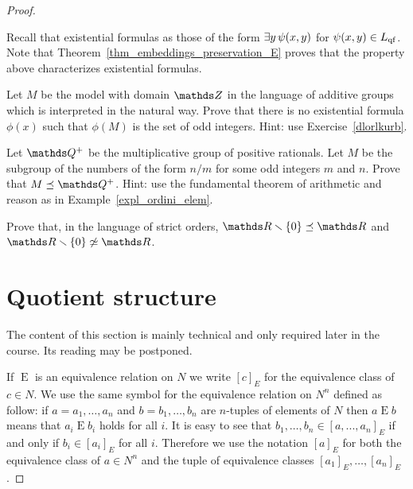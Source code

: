 \begin{proof}
\begin{exercise}
Recall that existential formulas as those of the form $\exists y\,\psi(x,y)$ for $\psi(x,y)\in L_{\rm qf}$.
Note that Theorem~\ref{thm_embeddings_preservation_E} proves that the property above characterizes existential formulas.

\end{exercise}

\begin{exercise}\label{ex_Z_odd_existential}
Let $M$ be the model with domain $\ZZ$ in the language of additive groups which is interpreted in the natural way.
Prove that there is no existential formula $\phi(x)$ such that $\phi(M)$ is the set of odd integers.
Hint: use Exercise~\ref{dlorlkurb}.
\end{exercise}


\begin{exercise}\label{ex_Q_odd}
Let $\QQ^+$ be the multiplicative group of positive rationals.
Let $M$ be the subgroup of the numbers of the form $n/m$ for some odd integers $m$ and $n$.
Prove that $M\preceq\QQ^+$.
Hint: use the fundamental theorem of arithmetic and reason as in Example~\ref{expl_ordini_elem}.
\end{exercise}

\begin{exercise} 
  Prove that, in the language of strict orders, $\RR\sm\{0\}\preceq \RR$ and $\RR\sm\{0\}\not\simeq \RR$.
\end{exercise}
  
\section{Quotient structure}\label{quotient}
\def\ceq#1#2#3{\parbox[b]{20ex}{$\displaystyle #1$}\parbox[b]{6ex}{\hfil$#2$}$\displaystyle #3$}

The content of this section is mainly technical and only required later in the course.
Its reading may be postponed.


If $\mathrel{E}$ is an equivalence relation on $N$ we write \emph{$[c]_E$\/} for the equivalence class of $c\in N$.
We use the same symbol for the equivalence relation on $N^n$ defined as follow: if $a=a_1,\dots,a_n$ and $b=b_1,\dots,b_n$ are $n$-tuples of elements of $N$ then \emph{$a\mathrel{E} b$\/} means that  $a_i\mathrel{E} b_i$ holds for all $i$.
It is easy to see that $b_1,\dots,b_n\in [a, ..., a_n]_E$ if and only if $b_i \in [a_i]_E$ for all $i$.
 Therefore we use the notation \emph{$[a]_E$\/} for both the equivalence class of $a\in N^n$ and the tuple of equivalence classes $[a_1]_E,\dots,[a_n]_E$.


\end{proof}
